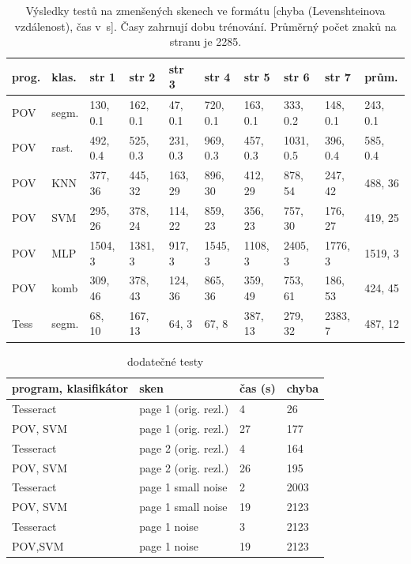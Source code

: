 \documentclass[12pt]{article}
\begin{document}
\begin{table}[htb]
{\scriptsize
\begin{tabular}{|l|l|l|l|l|l|l|l|l|l|} 
  \hline
  prog. & klas. & str 1 & str 2 & str 3 & str 4 & str 5 & str 6 & str 7 & prům. \\
  \hline\hline
  POV   & segm. & 130, 0.1 & 162, 0.1 & 47, 0.1  & 720, 0.1 & 163, 0.1 & 333, 0.2 & 148, 0.1 & 243, 0.1 \\
  \hline
  POV   & rast. & 492, 0.4 & 525, 0.3 & 231, 0.3 & 969, 0.3 & 457, 0.3 & 1031, 0.5& 396, 0.4 & 585, 0.4 \\
  \hline
  POV   & KNN   & 377, 36  & 445, 32  & 163, 29  & 896, 30  & 412, 29  & 878, 54  & 247, 42  & 488, 36  \\
  \hline
  POV   & SVM   & 295, 26  & 378, 24  & 114, 22  & 859, 23  & 356, 23  & 757, 30  & 176, 27  & 419, 25  \\
  \hline
  POV   & MLP   & 1504, 3  & 1381, 3  & 917, 3   & 1545, 3  & 1108, 3  & 2405, 3  & 1776, 3  & 1519, 3  \\
  \hline
  POV   & komb  & 309, 46  & 378, 43  & 124, 36  & 865, 36  & 359, 49  & 753, 61  & 186, 53  & 424, 45  \\
  \hline
  Tess  & segm. & 68, 10   & 167, 13  & 64, 3    & 67, 8    & 387, 13  & 279, 32  & 2383, 7  & 487, 12  \\
  \hline
\end{tabular}
}
\caption{Výsledky testů na zmenšených skenech ve formátu [chyba (Levenshteinova vzdálenost), čas v~s]. Časy zahrnují dobu trénování. Průměrný počet znaků na stranu je 2285.}
\label{tab:tests}
\end{table}

\begin{table}[htb]
{\scriptsize
\begin{tabular}{ |l|l|l|l| } 
  \hline
  program, klasifikátor & sken                 & čas (s) & chyba \\
  \hline\hline
  Tesseract             & page 1 (orig. rezl.) & 4       & 26    \\
  \hline
  POV, SVM              & page 1 (orig. rezl.) & 27      & 177   \\
  \hline
  Tesseract             & page 2 (orig. rezl.) & 4       & 164   \\
  \hline
  POV, SVM              & page 2 (orig. rezl.) & 26      & 195   \\
  \hline
  Tesseract             & page 1 small noise   & 2       & 2003  \\
  \hline
  POV, SVM              & page 1 small noise   & 19      & 2123  \\
  \hline
  Tesseract             & page 1 noise         & 3       & 2123  \\
  \hline
  POV,SVM               & page 1 noise         & 19      & 2123  \\
  \hline
\end{tabular}
}
\caption{dodatečné testy}
\end{table}
\end{document}
